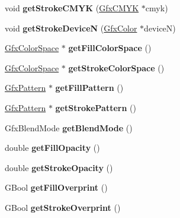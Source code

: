 \begin{DoxyCompactItemize}
void {\bfseries get\+Stroke\+C\+M\+YK} (\hyperlink{struct_gfx_c_m_y_k}{Gfx\+C\+M\+YK} $\ast$cmyk)
\item 
\mbox{\label{class_gfx_state_af1f34ce5bdda1f7c55b50d6600d2196f}} 
void {\bfseries get\+Stroke\+DeviceN} (\hyperlink{struct_gfx_color}{Gfx\+Color} $\ast$deviceN)
\item 
\mbox{\label{class_gfx_state_a3c479519868fa9e6935c2e694c2a3bdb}} 
\hyperlink{class_gfx_color_space}{Gfx\+Color\+Space} $\ast$ {\bfseries get\+Fill\+Color\+Space} ()
\item 
\mbox{\label{class_gfx_state_ad1cba912f17eaa4bbf8224cb44e57a0b}} 
\hyperlink{class_gfx_color_space}{Gfx\+Color\+Space} $\ast$ {\bfseries get\+Stroke\+Color\+Space} ()
\item 
\mbox{\label{class_gfx_state_a6a18bd4766fd681d547981615df80423}} 
\hyperlink{class_gfx_pattern}{Gfx\+Pattern} $\ast$ {\bfseries get\+Fill\+Pattern} ()
\item 
\mbox{\label{class_gfx_state_a5a2a3832a73691a3ab93dfc0a43b1cff}} 
\hyperlink{class_gfx_pattern}{Gfx\+Pattern} $\ast$ {\bfseries get\+Stroke\+Pattern} ()
\item 
\mbox{\label{class_gfx_state_a01fee9d53d2e1e8d13e75f53ec75bfb5}} 
Gfx\+Blend\+Mode {\bfseries get\+Blend\+Mode} ()
\item 
\mbox{\label{class_gfx_state_a658093167a238fa4a9f1d8e94c1c444f}} 
double {\bfseries get\+Fill\+Opacity} ()
\item 
\mbox{\label{class_gfx_state_aaf3a5634544a4061e600f4e5dab9ed65}} 
double {\bfseries get\+Stroke\+Opacity} ()
\item 
\mbox{\label{class_gfx_state_ad4d9e90cfd6dc8600f95962ecf68709a}} 
G\+Bool {\bfseries get\+Fill\+Overprint} ()
\item 
\mbox{\label{class_gfx_state_ab3a82ef1d62403f3819e47d670697f57}} 
G\+Bool {\bfseries get\+Stroke\+Overprint} ()
\item 
\mbox{\label{class_gfx_state_ab703eab6eed6db4e2dff58d72fd86133}} 

\end{DoxyCompactItemize}
